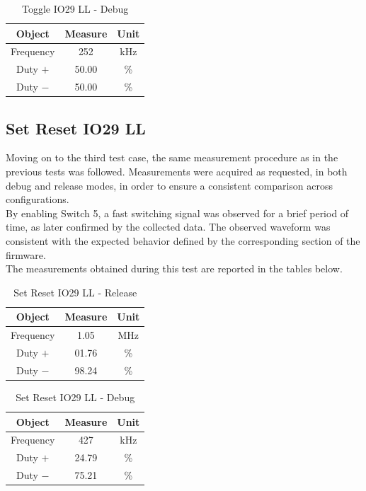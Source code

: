 \documentclass[../main.tex]{subfiles}
\begin{document}
\begin{table}[h]
\centering
\begin{tabular}{ccc}

\textbf{Object} & \textbf{Measure} & \textbf{Unit} \\
\hline
Frequency & 252 & kHz \\
\hline
Duty $+$ & 50.00 & \% \\
\hline
Duty $-$ & 50.00 & \% \\

\end{tabular}
\caption{Toggle IO29 LL - Debug}
\label{tab:example}
\end{table}




\subsection{Set Reset IO29 LL}

Moving on to the third test case, the same measurement procedure as in the previous tests was followed. Measurements were acquired as requested, in both debug and release modes, in order to ensure a consistent comparison across configurations.\\

By enabling Switch 5, a fast switching signal was observed for a brief period of time, as later confirmed by the collected data. The observed waveform was consistent with the expected behavior defined by the corresponding section of the firmware.\\

The measurements obtained during this test are reported in the tables below.\\

\begin{table}[h!]
\centering
\begin{tabular}{ccc}
\textbf{Object} & \textbf{Measure} & \textbf{Unit} \\
\hline
Frequency & 1.05 & MHz \\
\hline
Duty $+$ & 01.76 & \% \\
\hline
Duty $-$ & 98.24 & \% \\
\end{tabular}
\caption{Set Reset IO29 LL - Release}
\label{tab:example}
\end{table}

\begin{table}[h!]
\centering
\begin{tabular}{ccc}
\textbf{Object} & \textbf{Measure} & \textbf{Unit} \\
\hline
Frequency & 427 & kHz \\
\hline
Duty $+$ & 24.79 & \% \\
\hline
Duty $-$ & 75.21 & \% \\
\end{tabular}
\caption{Set Reset IO29 LL - Debug}
\label{tab:example}
\end{table}
\end{document}
